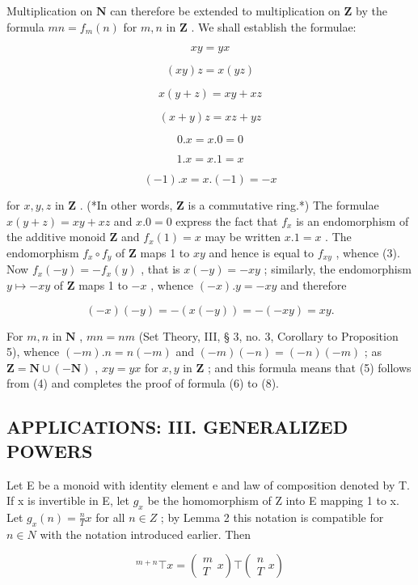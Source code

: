 Multiplication on \(\mathbf{N}\) can therefore be extended to multiplication on \(\mathbf{Z}\) by the formula \(mn = f_m(n)\) for \(m, n\) in \(\mathbf{Z}\) . We shall establish the formulae:

\[
x y = y x\tag{2}
\]

\[
(x y) z = x (y z)\tag{3}
\]

\[
x (y + z) = x y + x z\tag{4}
\]

\[
(x + y) z = x z + y z\tag{5}
\]

\[
0. x = x. 0 = 0\tag{6}
\]

\[
1. x = x. 1 = x\tag{7}
\]

\[
(- 1). x = x. (- 1) = - x\tag{8}
\]

for \(x, y, z\) in \(\mathbf{Z}\) . (*In other words, \(\mathbf{Z}\) is a commutative ring.*) The formulae \(x(y + z) = xy + xz\) and \(x.0 = 0\) express the fact that \(f_x\) is an endomorphism of the additive monoid \(\mathbf{Z}\) and \(f_{x}(1) = x\) may be written \(x.1 = x\) . The endomorphism \(f_{x} \circ f_{y}\) of \(\mathbf{Z}\) maps 1 to \(xy\) and hence is equal to \(f_{xy}\) , whence (3). Now \(f_{x}(-y) = -f_{x}(y)\) , that is \(x(-y) = -xy\) ; similarly, the endomorphism \(y \mapsto -xy\) of \(\mathbf{Z}\) maps 1 to \(-x\) , whence \((-x).y = -xy\) and therefore

\[
(- x) (- y) = - (x (- y)) = - (- x y) = x y.
\]

For \(m, n\) in \(\mathbf{N}\) , \(mn = nm\) (Set Theory, III, § 3, no. 3, Corollary to Proposition 5), whence \((-m).n = n(-m)\) and \((-m)(-n) = (-n)(-m)\) ; as \(\mathbf{Z} = \mathbf{N} \cup (-\mathbf{N})\) , \(xy = yx\) for \(x, y\) in \(\mathbf{Z}\) ; and this formula means that (5) follows from (4) and completes the proof of formula (6) to (8).

\subsection{APPLICATIONS: III. GENERALIZED POWERS}

Let E be a monoid with identity element e and law of composition denoted by T. If x is invertible in E, let \(g_{x}\) be the homomorphism of Z into E mapping 1 to x. Let \(g_{x}(n) = \frac{n}{T} x\) for all \(n \in Z\) ; by Lemma 2 this notation is compatible for \(n \in N\) with the notation introduced earlier. Then

\[
{ } ^ { m + n } \top x = \left( \begin{array} { c } m \\ T \end{array} x \right) \top \left( \begin{array} { c } n \\ T \end{array} x \right)\tag{9}
\]

